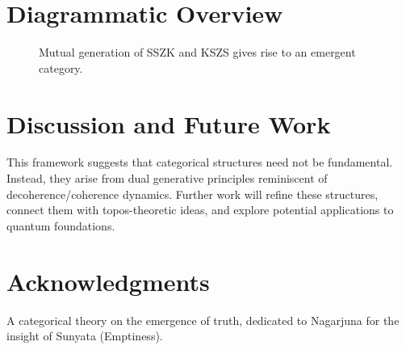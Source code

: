 \documentclass[11pt]{article}
\begin{document}
\section{Diagrammatic Overview}
\begin{figure}[h]
\centering
{}
\caption{Mutual generation of SSZK and KSZS gives rise to an emergent category.}
\end{figure}

\section{Discussion and Future Work}
This framework suggests that categorical structures need not be fundamental. Instead, they arise from dual generative principles reminiscent of decoherence/coherence dynamics. Further work will refine these structures, connect them with topos-theoretic ideas, and explore potential applications to quantum foundations.

\section*{Acknowledgments}
A categorical theory on the emergence of truth, dedicated to Nagarjuna for the insight of Sunyata (Emptiness).
\end{document}
